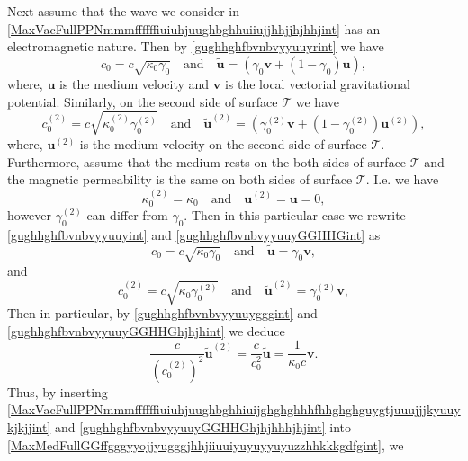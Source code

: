 \documentclass{article}
\theoremstyle{definition}
\theoremstyle{remark}
\renewcommand{\vec}[1]{\mathbf{#1}}
\newcommand{\er}{\eqref}
\newcommand{\er}{\eqref}
\begin{document}
Next assume that the wave we consider in
\er{MaxVacFullPPNmmmffffffiuiuhjuughbghhuiiujjhhjjhjhhjint} has an
electromagnetic nature. Then by \er{gughhghfbvnbvyyuuyrint} we have
\begin{equation}\label{gughhghfbvnbvyyuuyint}
c_0=c\sqrt{\kappa_0\gamma_0}\quad\text{and}\quad\vec {\tilde
u}=\left(\gamma_0\vec v+(1-\gamma_0)\vec u\right),
\end{equation}
where, $\vec u$ is the medium velocity and $\vec v$ is the local
vectorial gravitational potential. Similarly, on the second side of
surface $\mathcal{T}$ we have
\begin{equation}\label{gughhghfbvnbvyyuuyGGHHGint}
c^{(2)}_0=c\sqrt{\kappa^{(2)}_0\gamma^{(2)}_0}\quad\text{and}\quad\vec
{\tilde u}^{(2)}=\left(\gamma^{(2)}_0\vec v+(1-\gamma^{(2)}_0)\vec
u^{(2)}\right),
\end{equation}
where, $\vec u^{(2)}$ is the medium velocity on the second side of
surface $\mathcal{T}$. Furthermore, assume that the medium rests on
the both sides of surface $\mathcal{T}$ and the magnetic
permeability is the same on both sides of surface $\mathcal{T}$.
I.e. we have
\begin{equation}\label{gughhghfbvnbvyyuuyllint}
\kappa^{(2)}_0=\kappa_0\quad\text{and}\quad\vec u^{(2)}=\vec u=0,
\end{equation}
however $\gamma^{(2)}_0$ can differ from $\gamma_0$. Then in this
particular case we rewrite \er{gughhghfbvnbvyyuuyint} and
\er{gughhghfbvnbvyyuuyGGHHGint} as
\begin{equation}\label{gughhghfbvnbvyyuuygggint}
c_0=c\sqrt{\kappa_0\gamma_0}\quad\text{and}\quad\vec {\tilde
u}=\gamma_0\vec v,
\end{equation}
and
\begin{equation}\label{gughhghfbvnbvyyuuyGGHHGhjhjhint}
c^{(2)}_0=c\sqrt{\kappa_0\gamma^{(2)}_0}\quad\text{and}\quad\vec
{\tilde u}^{(2)}=\gamma^{(2)}_0\vec v,
\end{equation}
Then in particular, by \er{gughhghfbvnbvyyuuygggint} and
\er{gughhghfbvnbvyyuuyGGHHGhjhjhint} we deduce
\begin{equation}\label{gughhghfbvnbvyyuuyGGHHGhjhjhhhjhjint}
\frac{c}{\left(c^{(2)}_0\right)^2}\vec {\tilde
u}^{(2)}=\frac{c}{c^2_0}\vec {\tilde u}=\frac{1}{\kappa_0 c}\vec v.
\end{equation}
Thus, by inserting
\er{MaxVacFullPPNmmmffffffiuiuhjuughbghhiuijghghghhhfhhghghguygtjuuujjjkyuuykjkjjint}
and \er{gughhghfbvnbvyyuuyGGHHGhjhjhhhjhjint} into
\er{MaxMedFullGGffgggyyojjyugggjhhjiiuuiyuyuyyuyuzzhhkkkgdfgint}, we
\end{document}
